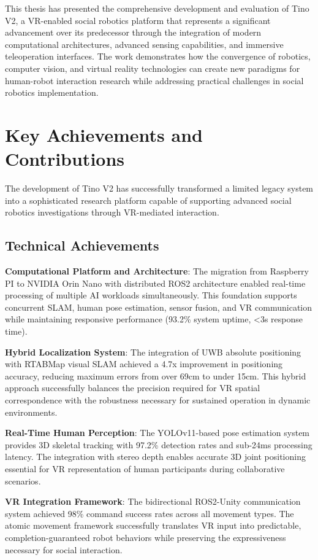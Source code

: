 This thesis has presented the comprehensive development and evaluation of Tino V2, a VR-enabled social robotics platform that represents a significant advancement over its predecessor through the integration of modern computational architectures, advanced sensing capabilities, and immersive teleoperation interfaces. The work demonstrates how the convergence of robotics, computer vision, and virtual reality technologies can create new paradigms for human-robot interaction research while addressing practical challenges in social robotics implementation.

\section{Key Achievements and Contributions}

The development of Tino V2 has successfully transformed a limited legacy system into a sophisticated research platform capable of supporting advanced social robotics investigations through VR-mediated interaction.

\subsection{Technical Achievements}

\textbf{Computational Platform and Architecture}: The migration from Raspberry PI to NVIDIA Orin Nano with distributed ROS2 architecture enabled real-time processing of multiple AI workloads simultaneously. This foundation supports concurrent SLAM, human pose estimation, sensor fusion, and VR communication while maintaining responsive performance (93.2\% system uptime, <3s response time).

\textbf{Hybrid Localization System}: The integration of UWB absolute positioning with RTABMap visual SLAM achieved a 4.7x improvement in positioning accuracy, reducing maximum errors from over 69cm to under 15cm. This hybrid approach successfully balances the precision required for VR spatial correspondence with the robustness necessary for sustained operation in dynamic environments.

\textbf{Real-Time Human Perception}: The YOLOv11-based pose estimation system provides 3D skeletal tracking with 97.2\% detection rates and sub-24ms processing latency. The integration with stereo depth enables accurate 3D joint positioning essential for VR representation of human participants during collaborative scenarios.

\textbf{VR Integration Framework}: The bidirectional ROS2-Unity communication system achieved 98\% command success rates across all movement types. The atomic movement framework successfully translates VR input into predictable, completion-guaranteed robot behaviors while preserving the expressiveness necessary for social interaction.

